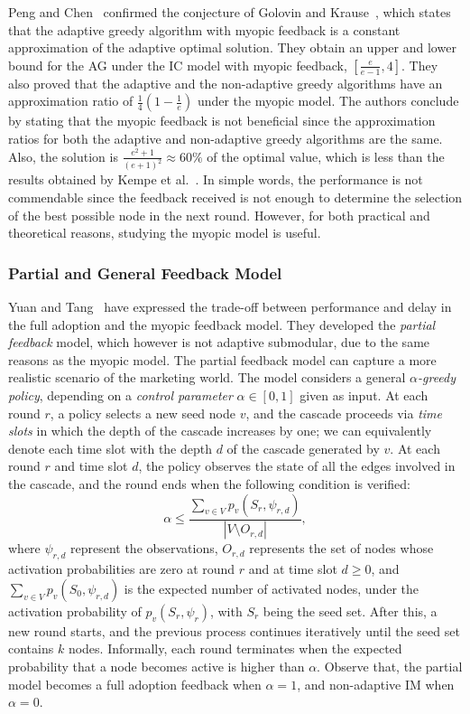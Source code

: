 Peng and Chen~\cite{Peng2019} confirmed the conjecture of Golovin and Krause~\cite{Golovin2011}, which states that the adaptive greedy algorithm with myopic feedback is a constant approximation of the adaptive optimal solution. They obtain an upper and lower bound for the AG under the IC model with myopic feedback, $[\frac {e}{e-1}, 4]$.  They also proved that the adaptive and the non-adaptive greedy algorithms have an approximation ratio of $\frac{1}{4}(1-\frac{1}{e})$ under the myopic model. The authors conclude by stating that the myopic feedback is not beneficial since the approximation ratios for both the adaptive and non-adaptive greedy algorithms are the same. Also, the solution is $\frac{e^2+1}{(e+1)^2} \approx 60\%$ of the optimal value, which is less than the results obtained by Kempe et al.~\cite{Kempe2015}. In simple words, the performance is not commendable since the feedback received is not enough to determine the selection of the best possible node in the next round. However, for both practical and theoretical reasons, studying the myopic model is useful.


\subsubsection{Partial and General Feedback Model}

Yuan and Tang~\cite{Yuan2017} have expressed the trade-off between performance and delay in the full adoption and the myopic feedback model. They developed the \emph{partial feedback} model, which however is not adaptive submodular, due to the same reasons as the myopic model. The partial feedback model can capture a more realistic scenario of the marketing world. The model considers a general {\em $\alpha$-greedy policy}, depending on a {\em control parameter} $\alpha\in [0,1]$ given as input. At each round $r$, a policy selects a new seed node $v$, and the cascade proceeds via {\em time slots} in which the depth of the cascade increases by one; we can equivalently denote each time slot with the depth $d$ of the cascade generated by $v$. At each round $r$ and time slot $d$, the policy observes the state of all the edges involved in the cascade, and the round ends when the following condition is verified:
\begin{equation}
\alpha \leq \frac{\sum_{v \in V} p_v(S_r, \psi_{r,d})}{|V \setminus O_{r,d}|}, 
\end{equation}
where $\psi_{r,d}$ represent the observations, $O_{r,d}$ represents the set of nodes whose activation probabilities are zero at round $r$ and at time slot $d\geq 0$, and $\sum_{v \in V} p_v(S_0, \psi_{r,d})$ is the expected number of activated nodes, under the activation probability of $p_v(S_r, \psi_r)$, with $S_r$ being the seed set. After this, a new round starts, and the previous process continues iteratively until the seed set contains $k$ nodes. Informally, each round terminates when the expected probability that a node becomes active is higher than $\alpha$. Observe that, the partial model becomes a full adoption feedback when $\alpha = 1$, and non-adaptive IM when $\alpha = 0$. 

